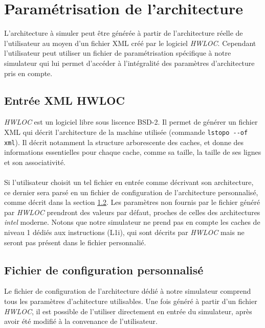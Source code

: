 \section{Paramétrisation de l'architecture}

L'architecture à simuler peut être générée à partir de l'architecture réelle de l'utilisateur au moyen d'un fichier XML créé par le logiciel \emph{HWLOC}. Cependant l'utilisateur peut utiliser un fichier de paramétrisation spécifique à notre simulateur qui lui permet d'accéder à l'intégralité des paramètres d'architecture pris en compte.

\subsection{Entrée XML HWLOC}

\emph{HWLOC} est un logiciel libre sous liscence BSD-2. Il permet de générer un fichier XML qui décrit l'architecture de la machine utilisée (commande \verb?lstopo --of xml?). Il décrit notamment la structure arborescente des caches, et donne des informations essentielles pour chaque cache, comme sa taille, la taille de ses lignes et son associativité. 

\paragraph{}
Si l'utilisateur choisit un tel fichier en entrée comme décrivant son architecture, ce dernier sera parsé en un fichier de configuration de l'architecture personnalisé, comme décrit dans la section \ref{config}. Les paramètres non fournis par le fichier généré par \emph{HWLOC} prendront des valeurs par défaut, proches de celles des architectures \emph{intel} moderne. Notons que notre simulateur ne prend pas en compte les caches de niveau 1 dédiés aux instructions (L1i), qui sont décrits par \emph{HWLOC} mais ne seront pas présent dans le fichier personnalié.

\subsection{Fichier de configuration personnalisé}
\label{config}
Le fichier de configuration de l'architecture dédié à notre simulateur comprend tous les paramètres d'achitecture utilisables. Une fois généré à partir d'un fichier \emph{HWLOC}, il est possible de l'utiliser directement en entrée du simulateur, après avoir été modifié à la convenance de l'utilisateur.

